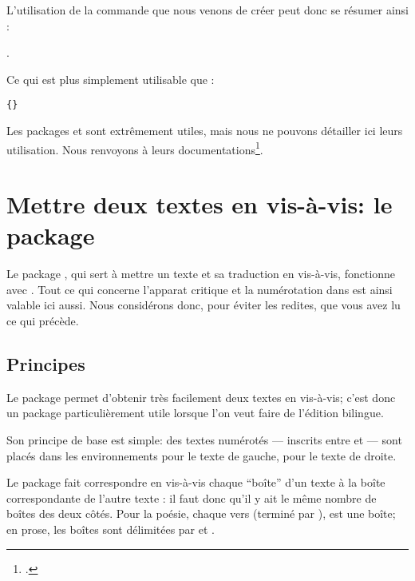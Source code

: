  L'utilisation de la commande que nous venons de créer peut donc se résumer ainsi : 
 
 . 
 
Ce qui est  plus simplement utilisable que :

\verb|{|\verb|}|

\begin{plusloins}
Les packages  et  sont extrêmement utiles, mais nous ne pouvons détailler ici leurs utilisation. Nous renvoyons à leurs documentations\footcites{ifthen}{xargs}.
\end{plusloins}





 






\section{Mettre deux textes en vis-à-vis: le package }


Le package , qui sert à mettre un texte et sa traduction en vis-à-vis, fonctionne avec . Tout ce qui concerne l'apparat critique et la numérotation dans  est ainsi valable ici aussi. Nous considérons donc, pour éviter les redites, que vous avez lu ce qui précède.



\subsection{Principes}

Le package  permet d'obtenir très facilement deux textes en vis-à-vis; c'est donc un package particulièrement utile lorsque l'on veut faire de l'édition bilingue.

Son principe de base est simple:  des textes numérotés  --- inscrits entre  et   --- sont placés dans les environnements  pour le texte de gauche,   pour le texte de droite.

Le package  fait correspondre en vis-à-vis chaque \enquote{boîte} d'un texte à la boîte correspondante de l'autre texte : il faut donc qu'il y ait le même nombre de boîtes des deux côtés. Pour la poésie,  chaque vers  (terminé par \ampersand ), est une boîte;  en prose, les boîtes sont délimitées par   et  .  

